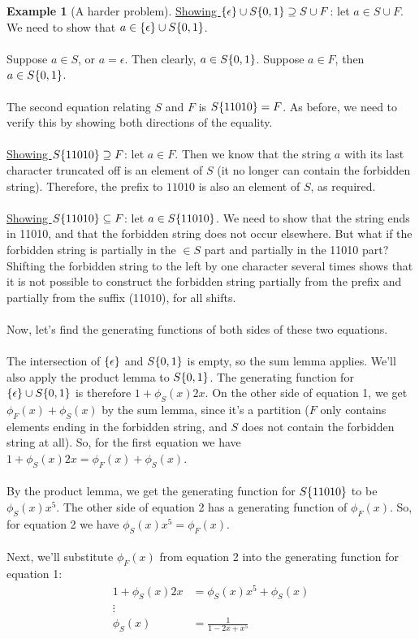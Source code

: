 \documentclass[]{article}
\theoremstyle{definition}
\newtheorem{ex}{Example}[section]
\newcommand{\lecture}[1]{\marginpar{{\footnotesize $\leftarrow$ \underline{#1}}}}
\DeclarePairedDelimiter{\set}{\lbrace}{\rbrace}
\begin{document}
\begin{ex}[A harder problem]
					\underline{Showing $\set{\epsilon } \cup S \set{0, 1 } \supseteq S \cup F$}: let $a \in S \cup F$. We need to show that $a \in \set{\epsilon } \cup S \set{0, 1 }$.
					\\ \\
					Suppose $a \in S$, or $a = \epsilon$. Then clearly, $a \in S \set{0, 1 }$. Suppose $a \in F$, then $a \in S \set{0, 1 }$.
					\\ \\
					The second equation relating $S$ and $F$ is $S\set{11010} = F$. As before, we need to verify this by showing both directions of the equality. \lecture{February 4, 2013} 
					\\ \\
					\underline{Showing $S\set{11010} \supseteq F$}: let $a \in F$. Then we know that the string $a$ with its last character truncated off is an element of $S$ (it no longer can contain the forbidden string). Therefore, the prefix to $11010$ is also an element of $S$, as required.
					\\ \\
					\underline{Showing $S\set{11010} \subseteq F$}: let $a \in S\set{11010}$. We need to show that the string ends in 11010, and that the forbidden string does not occur elsewhere. But what if the forbidden string is partially in the $\in S$ part and partially in the 11010 part? Shifting the forbidden string to the left by one character several times shows that it is not possible to construct the forbidden string partially from the prefix and partially from the suffix (11010), for all shifts.
					\\ \\
					Now, let's find the generating functions of both sides of these two equations.
					\\ \\
					The intersection of $\set{\epsilon }$ and $S\set{0, 1}$ is empty, so the sum lemma applies. We'll also apply the product lemma to $S\set{0, 1 }$. The generating function for $\set{\epsilon } \cup S\set{0, 1}$ is therefore $1 + \phi_S(x) 2x$. On the other side of equation 1, we get $\phi_F(x) + \phi_S(x)$ by the sum lemma, since it's a partition ($F$ only contains elements ending in the forbidden string, and $S$ does not contain the forbidden string at all). So, for the first equation we have $1 + \phi_S(x) 2x = \phi_F(x) + \phi_S(x)$.
					\\ \\
					By the product lemma, we get the generating function for $S\set{11010}$ to be $\phi_S(x) x^5$. The other side of equation 2 has a generating function of $\phi_F(x)$. So, for equation 2 we have $\phi_S(x) x^5 = \phi_F(x)$.
					\\ \\
					Next, we'll substitute $\phi_F(x)$ from equation 2 into the generating function for equation 1:
					\begin{align*}
						1 + \phi_S(x) 2x &= \phi_S(x) x^5 + \phi_S(x) \\
						\vdots& \\
						\phi_S(x) &= \frac{1}{1 - 2x + x^5}
					\end{align*}
				\end{ex}
\end{document}
